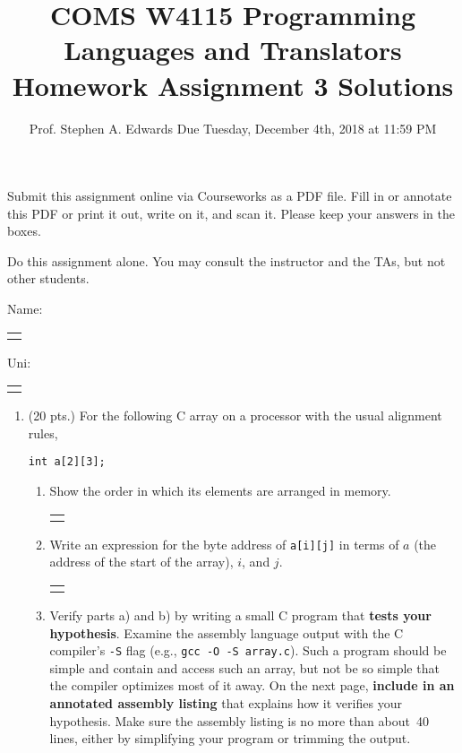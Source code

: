 \documentclass[letterpaper]{article}
\title{COMS W4115 Programming Languages and Translators \\
Homework Assignment 3 \ifkey Solutions \fi}
\author{
Prof. Stephen A. Edwards \quad\quad Due Tuesday, December 4th, 2018 at 11:59 PM
}
\date{}
\makeatletter
\newif\ifkey
\newcommand{\field}[2][]{
  \begin{tabular}{@{}c@{}}
    \fbox{\TextField[borderwidth=0,charsize=12pt,multiline=true,name={#2},#1]{}}
  \end{tabular}
  }
\makeatother
\begin{document}
\maketitle

\ifkey\else Submit this assignment online via Courseworks as a PDF
file.  Fill in or annotate this PDF or print it out, write on it, and
scan it.  Please keep your answers in the boxes.

Do this assignment alone.  You may consult the instructor and the TAs,
but not other students.
\fi

\begin{Form}

  \medskip
  
  Name: \field[height=2pc,width=30pc,multiline=false]{name}
  Uni: \field[height=2pc,width=5pc,multiline=false,maxlen=8]{uni}

\begin{enumerate}

\item (20 pts.) For the following C array on a processor with the
  usual alignment rules,

\begin{lstlisting}
int a[2][3];
\end{lstlisting}

\begin{enumerate}
\item Show the order in which its elements are arranged in memory.

  \field[height=4pc,width=40pc]{1a}

  \ifkey
{ \raggedright
  a[0][0] \quad a[0][1] \quad a[0][2] \quad
  a[1][0] \quad a[1][1] \quad a[1][2]
  \par}

C uses row-major order: A 2D array is an array of rows.
\fi

\item Write an expression for the byte address of \verb|a[i][j]| in
  terms of $a$ (the address of the start of the array), $i$, and $j$.

    \field[height=2pc,width=40pc]{1b}

\ifkey
$a + 4(3i + j)$
\fi

\item Verify parts a) and b) by writing a small C program that
  \textbf{tests your hypothesis}.  Examine the assembly language
  output with the C compiler's \verb|-S| flag (e.g.,
  \verb|gcc -O -S array.c|).  Such a program should be simple and
  contain and access such an array, but not be so simple that the
  compiler optimizes most of it away.  On the next page,
  \textbf{include in an annotated assembly listing} that explains how
  it verifies your hypothesis.  Make sure the assembly listing is no
  more than about~40 lines, either by simplifying your program or
  trimming the output.


\end{enumerate}
\end{enumerate}
\end{Form}
\end{document}
